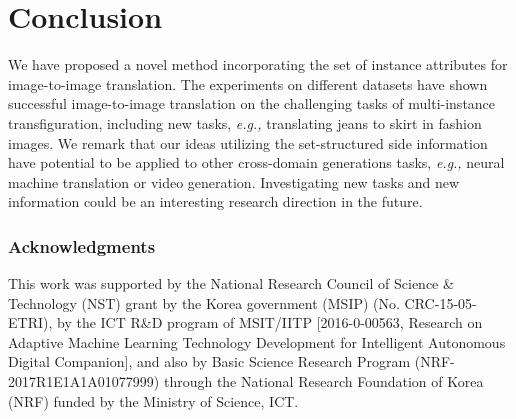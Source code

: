 \documentclass{article} \usepackage{iclr2019_conference,times}
\begin{document}
 \vspace{-0.05in}
\section{Conclusion}
\vspace{-0.05in}

We have proposed a novel method incorporating the set of instance attributes for image-to-image translation.
The experiments on different datasets have shown successful image-to-image translation on the challenging tasks of multi-instance transfiguration,
including new tasks, \textit{e.g.,} translating jeans to skirt in fashion images.
We remark that our ideas utilizing the set-structured side information  
have potential to be applied to other cross-domain generations tasks,
\textit{e.g.,} neural machine translation or video generation.
Investigating new tasks and new information could be an interesting research direction in the future. 
\subsubsection*{Acknowledgments}
This work was supported by the National Research Council of Science \& Technology (NST) grant by the Korea government (MSIP) (No. CRC-15-05-ETRI),
by the ICT R\&D program of MSIT/IITP [2016-0-00563, Research on Adaptive Machine Learning Technology Development for Intelligent Autonomous Digital Companion],
and also by Basic Science Research Program (NRF-2017R1E1A1A01077999) through the National Research Foundation of Korea (NRF) funded by the Ministry of Science, ICT.




\newpage
\appendix
\end{document}
